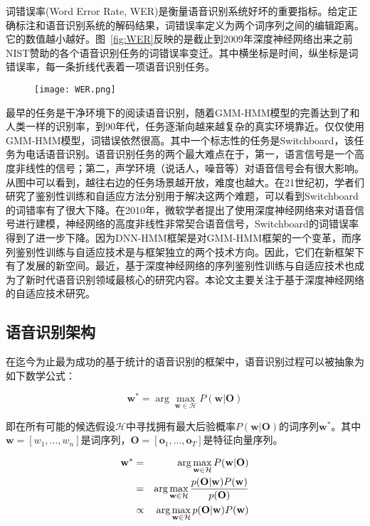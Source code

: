 词错误率(Word Error Rate, WER)是衡量语音识别系统好坏的重要指标。给定正确标注和语音识别系统的解码结果，词错误率定义为两个词序列之间的编辑距离。它的数值越小越好。图~\ref{fig:WER}反映的是截止到2009年深度神经网络出来之前NIST赞助的各个语音识别任务的词错误率变迁。其中横坐标是时间，纵坐标是词错误率，每一条折线代表着一项语音识别任务。
\begin{figure}[!htp]
  \centering
    \captionstyle{\centering}
    \centering
    \texttt{[image: WER.png]}
\end{figure}
最早的任务是干净环境下的阅读语音识别，随着GMM-HMM模型的完善达到了和人类一样的识别率，到90年代，任务逐渐向越来越复杂的真实环境靠近。仅仅使用GMM-HMM模型，词错误依然很高。其中一个标志性的任务是Switchboard，该任务为电话语音识别。语音识别任务的两个最大难点在于，第一，语言信号是一个高度非线性的信号；第二，声学环境（说话人，噪音等）对语音信号会有很大影响。从图中可以看到，越往右边的任务场景越开放，难度也越大。在21世纪初，学者们研究了鉴别性训练和自适应方法分别用于解决这两个难题，可以看到Switchboard的词错率有了很大下降。在2010年，微软学者提出了使用深度神经网络来对语音信号进行建模，神经网络的高度非线性非常契合语音信号，Switchboard的词错误率得到了进一步下降。因为DNN-HMM框架是对GMM-HMM框架的一个变革，而序列鉴别性训练与自适应技术是与框架独立的两个技术方向。因此，它们在新框架下有了发展的新空间。最近，基于深度神经网络的序列鉴别性训练与自适应技术也成为了新时代语音识别领域最核心的研究内容。本论文主要关注于基于深度神经网络的自适应技术研究。


\subsection{语音识别架构}
\label{chap:intro0-asr-framework}


在迄今为止最为成功的基于统计的语音识别的框架中，语音识别过程可以被抽象为如下数学公式：

\begin{equation}
    \label{eq:asr}
    \mathbf{w}^* = \arg \max_{\mathbf{w} \in \mathcal{H}}P(\mathbf{w}|\mathbf{O})
\end{equation}

即在所有可能的候选假设$\mathcal{H}$中寻找拥有最大后验概率$P(\mathbf{w}|\mathbf{O})$的词序列$\mathbf{w}^*$。其中$\mathbf{w}=\left[ w_1, ..., w_n \right]$是词序列，$\mathbf{O}=\left[ \mathbf{o}_1, ..., \mathbf{o}_T \right]$是特征向量序列。

\begin{eqnarray*}
    \centering
    \mathbf{w}^* &=& \arg \max_{\mathbf{w} \in \mathcal{H}}P(\mathbf{w}|\mathbf{O}) \\
    &=& \arg \max_{\mathbf{w} \in \mathcal{H}} \frac{p(\mathbf{O}|\mathbf{w})P(\mathbf{w})}{p(\mathbf{O})} \\
    &\propto& \arg \max_{\mathbf{w} \in \mathcal{H}} p(\mathbf{O}|\mathbf{w})P(\mathbf{w}) \\
\end{eqnarray*}


